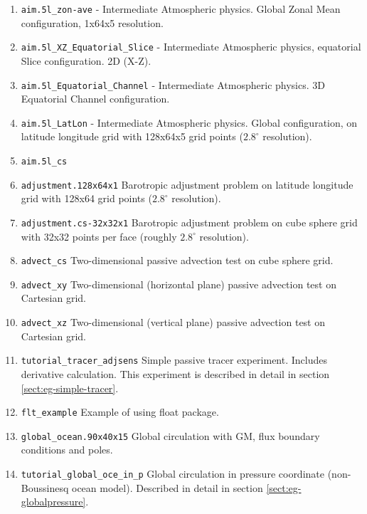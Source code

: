 \begin{enumerate}
\item \texttt{aim.5l\_zon-ave} - Intermediate Atmospheric physics.
  Global Zonal Mean configuration, 1x64x5 resolution.
  
\item \texttt{aim.5l\_XZ\_Equatorial\_Slice} - Intermediate
  Atmospheric physics, equatorial Slice configuration.  2D (X-Z).
  
\item \texttt{aim.5l\_Equatorial\_Channel} - Intermediate Atmospheric
  physics. 3D Equatorial Channel configuration.
  
\item \texttt{aim.5l\_LatLon} - Intermediate Atmospheric physics.
  Global configuration, on latitude longitude grid with 128x64x5 grid
  points ($2.8^\circ$ resolution).
  
\item \texttt{aim.5l\_cs}

\item \texttt{adjustment.128x64x1} Barotropic adjustment problem on
  latitude longitude grid with 128x64 grid points ($2.8^\circ$ resolution).
  
\item \texttt{adjustment.cs-32x32x1} Barotropic adjustment problem on
  cube sphere grid with 32x32 points per face (roughly $2.8^\circ$
  resolution).
  
\item \texttt{advect\_cs} Two-dimensional passive advection test on
  cube sphere grid.
  
\item \texttt{advect\_xy} Two-dimensional (horizontal plane) passive
  advection test on Cartesian grid.
  
\item \texttt{advect\_xz} Two-dimensional (vertical plane) passive
  advection test on Cartesian grid.
  
\item \texttt{tutorial\_tracer\_adjsens} Simple passive tracer
  experiment. Includes derivative calculation. This experiment is
  described in detail in section \ref{sect:eg-simple-tracer}.

\item \texttt{flt\_example} Example of using float package.
  
\item \texttt{global\_ocean.90x40x15} Global circulation with GM, flux
  boundary conditions and poles.

\item \texttt{tutorial\_global\_oce\_in\_p} Global circulation in
  pressure coordinate (non-Boussinesq ocean model). Described in
  detail in section \ref{sect:eg-globalpressure}.


\end{enumerate}
